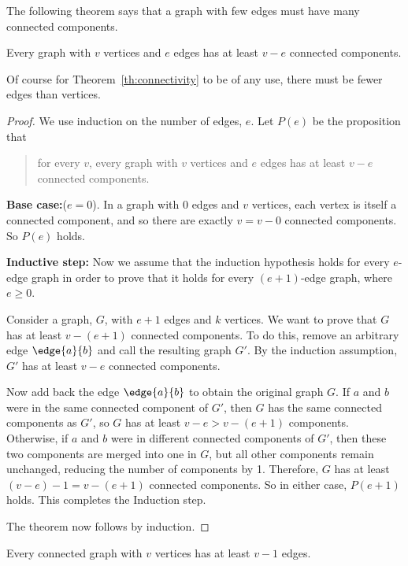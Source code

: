 The following theorem says that a graph with few edges must have many
connected components.

\begin{theorem} \label{th:connectivity}
Every graph with $v$ vertices and $e$ edges has at least $v - e$ connected
components.
\end{theorem}

Of course for Theorem~\ref{th:connectivity} to be of any use, there must
be fewer edges than vertices.

\begin{proof}
We use induction on the number of edges, $e$.  Let $P(e)$ be the
proposition that
\begin{quote}
for every $v$, every graph with $v$ vertices and $e$ edges has at least
$v-e$ connected components.
\end{quote}

\textbf{Base case:}($e=0$).  In a graph with 0 edges and $v$ vertices,
each vertex is itself a connected component, and so there are exactly $v =
v - 0$ connected components.  So $P(e)$ holds.

\textbf{Inductive step:} Now we assume that the induction hypothesis holds
for every $e$-edge graph in order to prove that it holds for every
$(e+1)$-edge graph, where $e \geq 0$.

Consider a graph, $G$, with $e + 1$ edges and $k$ vertices.  We want to
prove that $G$ has at least $v - (e+1)$ connected components.
To do this, remove an arbitrary edge $\edge{a}{b}$ and call the resulting
graph $G'$.  By the induction assumption, $G'$ has at least $v - e$
connected components.

Now add back the edge $\edge{a}{b}$ to obtain the original graph $G$.  If
$a$ and $b$ were in the same connected component of $G'$, then $G$ has the
same connected components as $G'$, so $G$ has at least $v -e > v - (e+1)$
components.  Otherwise, if $a$ and $b$ were in different connected
components of $G'$, then these two components are merged into one in $G$,
but all other components remain unchanged, reducing the number of
components by 1.  Therefore, $G$ has at least $(v - e) - 1 = v - (e+1)$
connected components.  So in either case, $P(e+1)$ holds.  This completes
the Induction step.

The theorem now follows by induction.
\end{proof}

\begin{corollary}
\label{cor:n-1}
Every connected graph with $v$ vertices has at least $v - 1$ edges.
\end{corollary}

